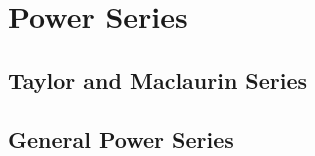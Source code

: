 \section{Power Series}



\subsection{Taylor and Maclaurin Series}




\subsection{General Power Series}